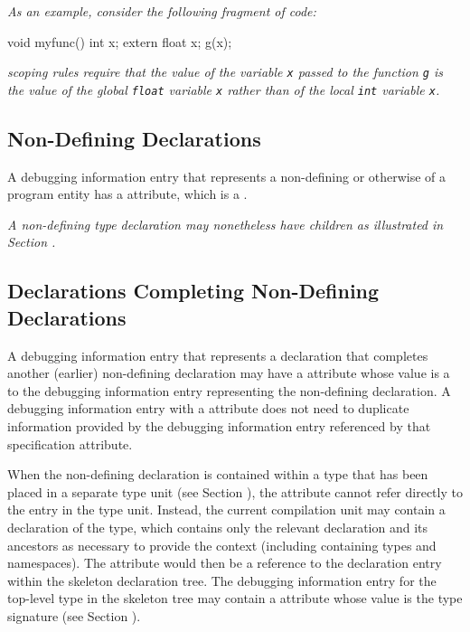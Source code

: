 \textit{As an example, consider the following fragment of  code:}

\begin{nlnlisting}
void myfunc()
{
  int x;
  {
    extern float x;
    g(x);
  }
}
\end{nlnlisting}


\textit{ scoping rules require that the
value of the variable \texttt{x} passed to the function
\texttt{g} is the value of the global \texttt{float}
variable \texttt{x} rather than of the local \texttt{int}
variable \texttt{x}.}

\subsection{Non-Defining Declarations}
A debugging information entry that
represents a non-defining
or otherwise
of a program entity has a
\DWATdeclarationDEFN{} attribute, which is a
.

\textit{A non-defining type declaration may nonetheless have
children as illustrated in Section
.}


\subsection{Declarations Completing Non-Defining Declarations}
\hypertarget{chap:DWATspecificationincompletenondefiningorseparatedeclaration}{}
A debugging information entry that represents a declaration
that completes another (earlier) non-defining declaration may have a
\DWATspecificationDEFN{}
attribute whose value is a  to
the debugging information entry representing the non-defining declaration.
A debugging information entry with a
\DWATspecificationNAME{}
attribute does not need to duplicate information provided by the
debugging information entry referenced by that specification attribute.

When the non-defining declaration is contained within a type that has
been placed in a separate type unit (see Section ),
the \DWATspecification{} attribute cannot refer directly to the entry in
the type unit. Instead, the current compilation unit may contain a
 declaration of the type, which contains only the relevant
declaration and its ancestors as necessary to provide the context
(including containing types and namespaces). The \DWATspecification{}
attribute would then be a reference to the declaration entry within
the skeleton declaration tree. The debugging information entry for the
top-level type in the skeleton tree may contain a \DWATsignature{}
attribute whose value is the type signature
(see Section ).

